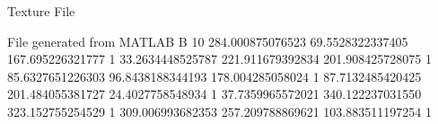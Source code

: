 Texture File

File generated from MATLAB
B 10
284.000875076523	69.5528322337405	167.695226321777	1
33.2634448525787	221.911679392834	201.908425728075	1
85.6327651226303	96.8438188344193	178.004285058024	1
87.7132485420425	201.484055381727	24.4027758548934	1
37.7359965572021	340.122237031550	323.152755254529	1
309.006993682353	257.209788869621	103.883511197254	1
